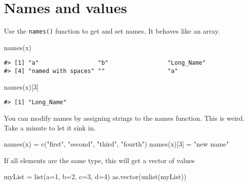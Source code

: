 \documentclass[
]{book}
\newenvironment{Shaded}{\begin{snugshade}}{\end{snugshade}}
\newcommand{\AttributeTok}[1]{\textcolor[rgb]{0.77,0.63,0.00}{#1}}
\newcommand{\DecValTok}[1]{\textcolor[rgb]{0.00,0.00,0.81}{#1}}
\newcommand{\FunctionTok}[1]{\textcolor[rgb]{0.00,0.00,0.00}{#1}}
\newcommand{\NormalTok}[1]{#1}
\newcommand{\OtherTok}[1]{\textcolor[rgb]{0.56,0.35,0.01}{#1}}
\newcommand{\StringTok}[1]{\textcolor[rgb]{0.31,0.60,0.02}{#1}}
\begin{document}
\hypertarget{names-and-values}{%
\section{Names and values}\label{names-and-values}}

Use the \texttt{names()} function to get and set names. It behaves like an array.

\begin{Shaded}
\begin{Highlighting}[]
\FunctionTok{names}\NormalTok{(x)}
\end{Highlighting}
\end{Shaded}

\begin{verbatim}
#> [1] "a"                 "b"                 "Long_Name"        
#> [4] "named with spaces" ""                  "a"
\end{verbatim}

\begin{Shaded}
\begin{Highlighting}[]
\FunctionTok{names}\NormalTok{(x)[}\DecValTok{3}\NormalTok{]}
\end{Highlighting}
\end{Shaded}

\begin{verbatim}
#> [1] "Long_Name"
\end{verbatim}

You can modify names by assigning strings to the names function. This is weird. Take a minute to let it sink in.

\begin{Shaded}
\begin{Highlighting}[]
\FunctionTok{names}\NormalTok{(x) }\OtherTok{=} \FunctionTok{c}\NormalTok{(}\StringTok{"first"}\NormalTok{, }\StringTok{"second"}\NormalTok{, }\StringTok{"third"}\NormalTok{, }\StringTok{"fourth"}\NormalTok{)}
\FunctionTok{names}\NormalTok{(x)[}\DecValTok{3}\NormalTok{] }\OtherTok{=} \StringTok{"new name"}
\end{Highlighting}
\end{Shaded}

If all elements are the same type, this will get a vector of values

\begin{Shaded}
\begin{Highlighting}[]
\NormalTok{myList }\OtherTok{=} \FunctionTok{list}\NormalTok{(}\AttributeTok{a=}\DecValTok{1}\NormalTok{, }\AttributeTok{b=}\DecValTok{2}\NormalTok{, }\AttributeTok{c=}\DecValTok{3}\NormalTok{, }\AttributeTok{d=}\DecValTok{4}\NormalTok{)}
\FunctionTok{as.vector}\NormalTok{(}\FunctionTok{unlist}\NormalTok{(myList))}
\end{Highlighting}
\end{Shaded}
\end{document}
